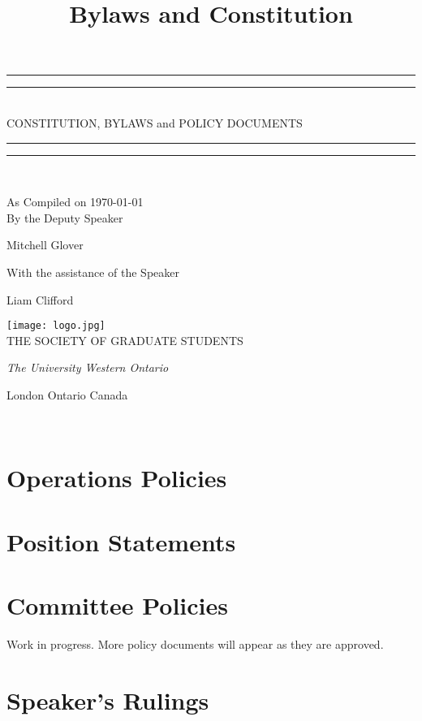 \documentclass[12pt,letterpaper,oneside]{book}
\title{Bylaws and Constitution}
\newcommand*{\titleGP}{\begingroup %
\centering %
\vspace*{\baselineskip} %

\rule{\textwidth}{1.6pt}\vspace*{-\baselineskip}\vspace*{2pt} %
\rule{\textwidth}{0.4pt}\\[\baselineskip] %

{\LARGE CONSTITUTION, BYLAWS} 
and
{\LARGE POLICY DOCUMENTS}

\rule{\textwidth}{0.4pt}\vspace*{-\baselineskip}\vspace{3.2pt} %
\rule{\textwidth}{1.6pt}\\[\baselineskip] %



\vspace*{2\baselineskip} %

As Compiled on \today \\[\baselineskip]
By the Deputy Speaker

{\Large Mitchell Glover \par} %
\vspace*{\baselineskip} %
With the assistance of the Speaker \\[\baselineskip]
{\large Liam Clifford \par}


\vfill %

\texttt{[image: logo.jpg]}\\[1cm]


{\large THE SOCIETY OF GRADUATE STUDENTS}\par %
\scshape %
{\itshape The University Western Ontario\par} %
London Ontario Canada\par %
\the\year \\[0.3\baselineskip] %
\endgroup}
\begin{document}
 

\pagestyle{empty} %

\titleGP %

\tableofcontents %
\pagebreak %
\pagestyle{plain}






%

%
%


%
\chapter{Operations Policies}






\chapter{Position Statements}


\chapter{Committee Policies}
Work in progress. More policy documents will appear as they are approved.

















\chapter{Speaker's Rulings}





\newpage
 
%
\printindex
\end{document}
